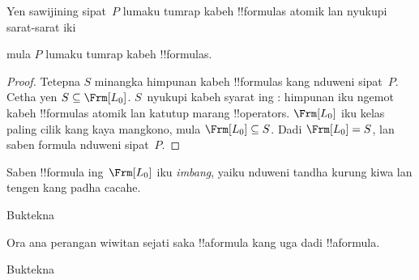 \documentclass[../../../include/open-logic-section]{subfiles}
\begin{document}


\begin{thm}
  Yen sawijining sipat~$P$ lumaku tumrap kabeh !!{formula}s atomik lan
  nyukupi sarat-sarat iki
  \begin{enumerate}
  \end{enumerate}
  mula $P$ lumaku tumrap kabeh !!{formula}s.
\end{thm}

\begin{proof}
  Tetepna $S$ minangka himpunan kabeh !!{formula}s kang nduweni sipat~$P$. Cetha yen
  $S \subseteq \Frm[L_0]$. $S$~nyukupi kabeh syarat ing
  : himpunan iku ngemot kabeh !!{formula}s atomik lan
  katutup marang !!{operator}s. $\Frm[L_0]$ iku kelas paling cilik kang
  kaya mangkono, mula $\Frm[L_0] \subseteq S$. Dadi $\Frm[L_0] = S$, lan
  saben formula nduweni sipat~$P$.
\end{proof}

\begin{prop}
   Saben !!{formula} ing~$\Frm[L_0]$ iku \emph{imbang}, yaiku nduweni
   tandha kurung kiwa lan tengen kang padha cacahe.
\end{prop}

\begin{prob}
Buktekna 
\end{prob}

\begin{prop} 
Ora ana perangan wiwitan sejati saka !!a{formula} kang uga dadi
!!a{formula}.
\end{prop}

\begin{prob}
  Buktekna 
\end{prob}
\end{document}

